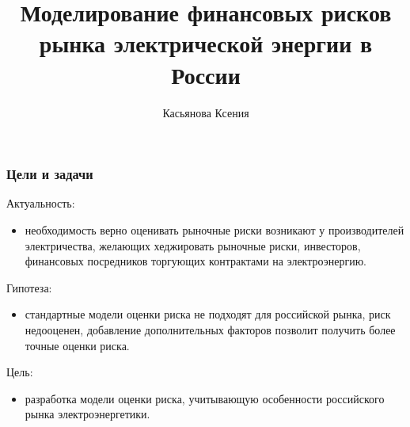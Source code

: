 \documentclass[c, dvipsnames]{beamer}  %
\title[   Моделирование финансовых рисков     ]{Моделирование финансовых рисков    рынка электрической энергии в России }
\author[Касьянова Ксения]{Касьянова Ксения \\ \smallskip \scriptsize  }
\institute[РАНХиГС]{ \uppercase{
  Институт отраслевых рынков и инфраструктуры}}
\date{}
\begin{document}
\frame[plain]{\titlepage}	%

\begin{frame}[shrink=3]
\frametitle{Цели и задачи} 


\begin{block}{Актуальность:}
	\begin{itemize}
		
		\item необходимость верно оценивать рыночные риски возникают у производителей электричества, желающих хеджировать рыночные риски,  инвесторов,  финансовых посредников  торгующих контрактами на электроэнергию.
%				
		


	\end{itemize}
\end{block}


\begin{block}{Гипотеза:}
	\begin{itemize}
		
		\item стандартные модели оценки риска не подходят для российской рынка, риск недооценен, добавление дополнительных факторов позволит получить более точные оценки риска. 
	
		
		
		
	\end{itemize}
\end{block}


\begin{block}{Цель:}
	\begin{itemize}
		
		
		\item  разработка модели оценки риска,  учитывающую  особенности российского рынка электроэнергетики. 
		
		
		

		

\end{itemize}
\end{block}
\end{frame}
\end{document}
